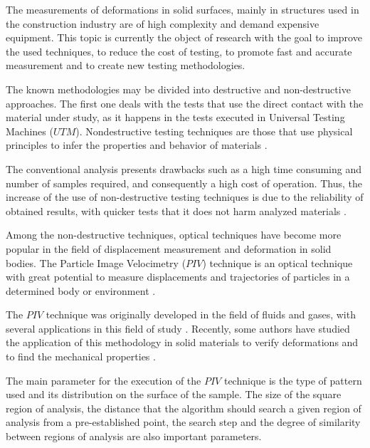 The measurements of deformations in solid surfaces, mainly in structures used in the 
construction industry are of high complexity and demand expensive equipment. This topic is 
currently the object of research with the goal to improve the used techniques, to reduce the 
cost of testing, to promote fast and accurate measurement and to create new testing 
methodologies.%

The known methodologies may be divided into destructive and non-destructive approaches.
The first one deals with the tests that use the direct contact with the material under 
study, as it happens in the tests executed in Universal Testing Machines ($UTM$). 
Nondestructive testing techniques are those that use physical principles to infer the properties and 
behavior of materials \cite{Pereira2017}. 

The conventional analysis \cite{GOUVEA} 
presents drawbacks such as a high time consuming and number of samples required,
and consequently a high cost of operation. Thus, 
the increase of the use of non-destructive testing techniques is due to the reliability of obtained 
results, with quicker tests  that it does not harm  analyzed materials \cite{DEPAULA}.

Among the non-destructive techniques, optical techniques have become more popular 
in the field of displacement measurement  and deformation in solid bodies. The Particle 
Image Velocimetry ($PIV$) technique is an optical technique with great potential to measure 
displacements and trajectories of particles in a determined body or environment \cite{Pereira2017}.

\begin{sloppypar}
The $PIV$ technique was originally developed in the field of fluids and gases, with 
several applications in this field of study \cite{BANGALEE,XU}. 
Recently, some authors have studied the application of this methodology in solid materials to 
verify deformations and to find the mechanical properties \cite{BRAGAJUNIOR,MAGALHAES,PEREIRA,SOUZA}.
\end{sloppypar}

The main parameter for the execution of the $PIV$ technique is the type of pattern used 
and its distribution on the surface of the sample. The size of the square region of analysis,
 the distance that the algorithm should search a given region of 
analysis from a pre-established point, the search step and the degree of similarity 
between regions of analysis are also important parameters.

